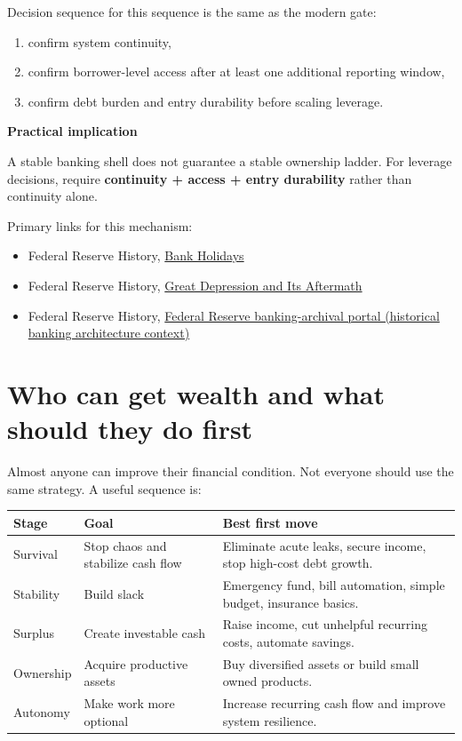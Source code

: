 \documentclass[11pt,openany]{book}
\begin{document}
Decision sequence for this sequence is the same as the modern gate:

\begin{enumerate}
  \item confirm system continuity,
  \item confirm borrower-level access after at least one additional reporting window,
  \item confirm debt burden and entry durability before scaling leverage.
\end{enumerate}

\begin{notebox}
\textbf{Practical implication}\par
A stable banking shell does not guarantee a stable ownership ladder. For leverage decisions, require \textbf{continuity + access + entry durability} rather than continuity alone.
\end{notebox}

\noindent Primary links for this mechanism:
\begin{itemize}
  \item Federal Reserve History, \href{https://www.federalreservehistory.org/essays/bank-holidays}{Bank Holidays}
  \item Federal Reserve History, \href{https://www.federalreservehistory.org/time-period/the-great-depression-and-its-aftermath}{Great Depression and Its Aftermath}
  \item Federal Reserve History, \href{https://fraser.stlouisfed.org/title/banking/2019}{Federal Reserve banking-archival portal (historical banking architecture context)}
\end{itemize}

\chapter{Who can get wealth and what should they do first}

Almost anyone can improve their financial condition. Not everyone should use the same strategy. A useful sequence is:

\begin{center}
\begin{tabularx}{\textwidth}{>{\raggedright\arraybackslash}p{}X X}
\toprule
\textbf{Stage} & \textbf{Goal} & \textbf{Best first move} \\
\midrule
Survival & Stop chaos and stabilize cash flow & Eliminate acute leaks, secure income, stop high-cost debt growth. \\
Stability & Build slack & Emergency fund, bill automation, simple budget, insurance basics. \\
Surplus & Create investable cash & Raise income, cut unhelpful recurring costs, automate savings. \\
Ownership & Acquire productive assets & Buy diversified assets or build small owned products. \\
Autonomy & Make work more optional & Increase recurring cash flow and improve system resilience. \\
\bottomrule
\end{tabularx}
\end{center}
\end{document}
